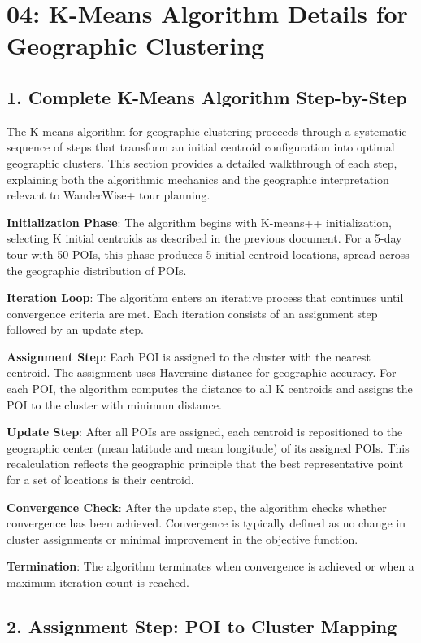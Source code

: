 \chapter{04: K-Means Algorithm Details for Geographic Clustering}

\section{1. Complete K-Means Algorithm Step-by-Step}

The K-means algorithm for geographic clustering proceeds through a systematic sequence of steps that transform an initial centroid configuration into optimal geographic clusters. This section provides a detailed walkthrough of each step, explaining both the algorithmic mechanics and the geographic interpretation relevant to WanderWise+ tour planning.

\textbf{Initialization Phase}: The algorithm begins with K-means++ initialization, selecting K initial centroids as described in the previous document. For a 5-day tour with 50 POIs, this phase produces 5 initial centroid locations, spread across the geographic distribution of POIs.

\textbf{Iteration Loop}: The algorithm enters an iterative process that continues until convergence criteria are met. Each iteration consists of an assignment step followed by an update step.

\textbf{Assignment Step}: Each POI is assigned to the cluster with the nearest centroid. The assignment uses Haversine distance for geographic accuracy. For each POI, the algorithm computes the distance to all K centroids and assigns the POI to the cluster with minimum distance.

\textbf{Update Step}: After all POIs are assigned, each centroid is repositioned to the geographic center (mean latitude and mean longitude) of its assigned POIs. This recalculation reflects the geographic principle that the best representative point for a set of locations is their centroid.

\textbf{Convergence Check}: After the update step, the algorithm checks whether convergence has been achieved. Convergence is typically defined as no change in cluster assignments or minimal improvement in the objective function.

\textbf{Termination}: The algorithm terminates when convergence is achieved or when a maximum iteration count is reached.

\section{2. Assignment Step: POI to Cluster Mapping}

